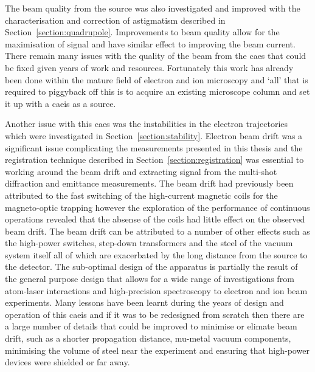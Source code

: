 The beam quality from the source was also investigated and improved with the characterisation and correction of astigmatism described in Section~\ref{section:quadrupole}.
Improvements to beam quality allow for the maximisation of signal and have similar effect to improving the beam current.
There remain many issues with the quality of the beam from the \gls{caes} that could be fixed given years of work and resources.
Fortunately this work has already been done within the mature field of electron and ion microscopy and `all' that is required to piggyback off this is to acquire an existing microscope column and set it up with a \gls{caeis} as a source.

Another issue with this \gls{caes} was the instabilities in the electron trajectories which were investigated in Section~\ref{section:stability}.
Electron beam drift was a significant issue complicating the measurements presented in this thesis and the registration technique described in Section~\ref{section:registration} was essential to working around the beam drift and extracting signal from the multi-shot diffraction and emittance measurements.
The beam drift had previously been attributed to the fast switching of the high-current magnetic coils for the magneto-optic trapping however the exploration of the performance of continuous operations revealed that the absense of the coils had little effect on the observed beam drift.
The beam drift can be attributed to a number of other effects such as the high-power switches, step-down transformers and the steel of the vacuum system itself all of which are exacerbated by the long distance from the source to the detector.
The sub-optimal design of the apparatus is partially the result of the general purpose design that allows for a wide range of investigations from atom-laser interactions and high-precision spectroscopy to electron and ion beam experiments.
Many lessons have been learnt during the years of design and operation of this \gls{caeis} and if it was to be redesigned from scratch then there are a large number of details that could be improved to minimise or elimate beam drift, such as a shorter propagation distance, mu-metal vacuum components, minimising the volume of steel near the experiment and ensuring that high-power devices were shielded or far away.

